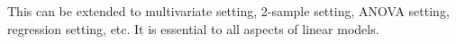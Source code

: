 \documentclass[11pt,fleqn]{book} %
\begin{document}
This can be extended to multivariate setting, 2-sample setting, ANOVA setting, regression setting, etc. It is essential to all aspects of linear models. 




	





















\end{document}
